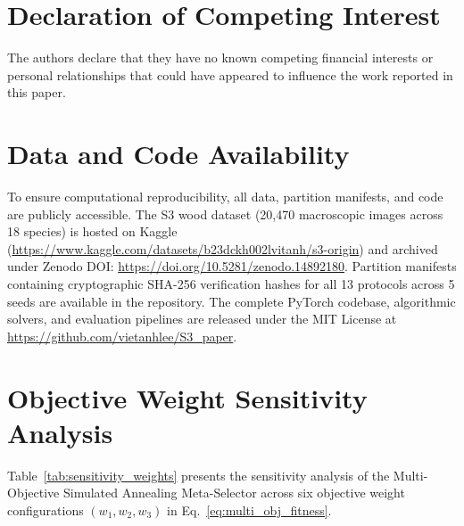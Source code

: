 \documentclass[a4paper,fleqn]{cas-sc}
\begin{document}
\section*{Declaration of Competing Interest}
The authors declare that they have no known competing financial interests or personal relationships that could have appeared to influence the work reported in this paper.

\section*{Data and Code Availability}
To ensure computational reproducibility, all data, partition manifests, and code are publicly accessible. The S3 wood dataset (20,470 macroscopic images across 18 species) is hosted on Kaggle (\url{https://www.kaggle.com/datasets/b23dckh002lvitanh/s3-origin}) and archived under Zenodo DOI: \url{https://doi.org/10.5281/zenodo.14892180}. Partition manifests containing cryptographic SHA-256 verification hashes for all 13 protocols across 5 seeds are available in the repository. The complete PyTorch codebase, algorithmic solvers, and evaluation pipelines are released under the MIT License at \url{https://github.com/vietanhlee/S3_paper}.

\appendix
\section{Objective Weight Sensitivity Analysis}
\label{app:sensitivity}

Table~\ref{tab:sensitivity_weights} presents the sensitivity analysis of the Multi-Objective Simulated Annealing Meta-Selector across six objective weight configurations $(w_1, w_2, w_3)$ in Eq.~\eqref{eq:multi_obj_fitness}.
\end{document}
